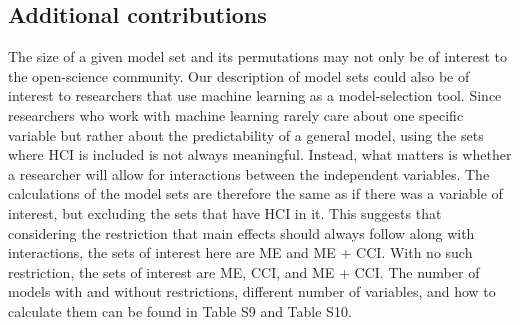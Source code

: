 \subsection{Additional contributions}
The size of a given model set and its permutations may not only be of interest to the open-science community. Our description of model sets could also be of interest to researchers that use machine learning as a model-selection tool. Since researchers who work with machine learning rarely care about one specific variable but rather about the predictability of a general model, using the sets where HCI is included is not always meaningful. Instead, what matters is whether a researcher will allow for interactions between the independent variables. The calculations of the model sets are therefore the same as if there was a variable of interest, but excluding the sets that have HCI in it. This suggests that considering the restriction that main effects should always follow along with interactions, the sets of interest here are ME and ME + CCI. With no such restriction, the sets of interest are ME, CCI, and ME + CCI. The number of models with and without restrictions, different number of variables, and how to calculate them can be found in Table S9 and Table S10. 


 
